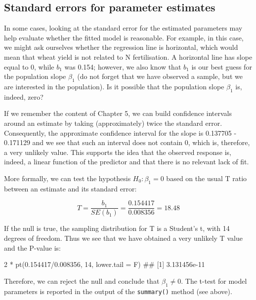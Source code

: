 \documentclass[a4paper,12pt,oneside]{book}
\newenvironment{Shaded}{\begin{snugshade}}{\end{snugshade}}
\newcommand{\DecValTok}[1]{#1}
\newcommand{\FloatTok}[1]{#1}
\newcommand{\SpecialCharTok}[1]{#1}
\newcommand{\DocumentationTok}[1]{#1}
\newcommand{\FunctionTok}[1]{#1}
\newcommand{\AttributeTok}[1]{#1}
\newcommand{\NormalTok}[1]{#1}
\begin{document}
\hypertarget{standard-errors-for-parameter-estimates}{%
\subsection{Standard errors for parameter estimates}\label{standard-errors-for-parameter-estimates}}

In some cases, looking at the standard error for the estimated parameters may help evaluate whether the fitted model is reasonable. For example, in this case, we might ask ourselves whether the regression line is horizontal, which would mean that wheat yield is not related to N fertilisation. A horizontal line has slope equal to 0, while \(b_1\) was 0.154; however, we also know that \(b_1\) is our best guess for the population slope \(\beta_1\) (do not forget that we have observed a sample, but we are interested in the population). Is it possible that the population slope \(\beta_1\) is, indeed, zero?

If we remember the content of Chapter 5, we can build confidence intervals around an estimate by taking (approximately) twice the standard error. Consequently, the approximate confidence interval for the slope is 0.137705 - 0.171129 and we see that such an interval does not contain 0, which is, therefore, a very unlikely value. This supports the idea that the observed response is, indeed, a linear function of the predictor and that there is no relevant lack of fit.

More formally, we can test the hypothesis \(H_0: \beta_1 = 0\) based on the usual T ratio between an estimate and its standard error:

\[T = \frac{b_1}{SE(b_1)} = \frac{0.154417}{0.008356} = 18.48\]

If the null is true, the sampling distribution for T is a Student's t, with 14 degrees of freedom. Thus we see that we have obtained a very unlikely T value and the P-value is:

\begin{Shaded}
\begin{Highlighting}[]
\DecValTok{2} \SpecialCharTok{*} \FunctionTok{pt}\NormalTok{(}\FloatTok{0.154417}\SpecialCharTok{/}\FloatTok{0.008356}\NormalTok{, }\DecValTok{14}\NormalTok{, }\AttributeTok{lower.tail =}\NormalTok{ F)}
\DocumentationTok{\#\# [1] 3.131456e{-}11}
\end{Highlighting}
\end{Shaded}

Therefore, we can reject the null and conclude that \(\beta_1 \ne 0\). The t-test for model parameters is reported in the output of the \texttt{summary()} method (see above).
\end{document}

